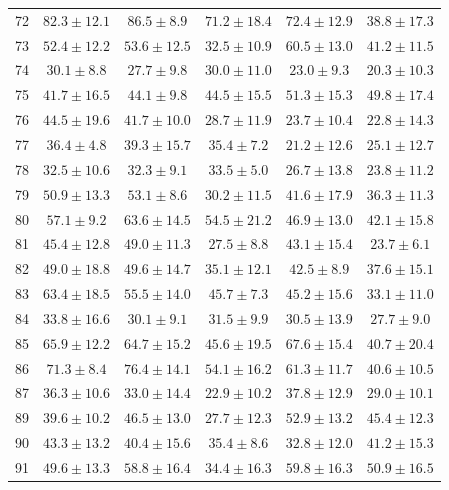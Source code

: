 \begin{tabular}{lccccc}
72 & $82.3 \pm 12.1$ & $\mathbf{86.5} \pm 8.9$ & $71.2 \pm 18.4$ & $72.4 \pm 12.9$ & $38.8 \pm 17.3$ \\
73 & $52.4 \pm 12.2$ & $53.6 \pm 12.5$ & $32.5 \pm 10.9$ & $\mathbf{60.5} \pm 13.0$ & $41.2 \pm 11.5$ \\
74 & $\mathbf{30.1} \pm 8.8$ & $27.7 \pm 9.8$ & $30.0 \pm 11.0$ & $23.0 \pm 9.3$ & $20.3 \pm 10.3$ \\
75 & $41.7 \pm 16.5$ & $44.1 \pm 9.8$ & $44.5 \pm 15.5$ & $\mathbf{51.3} \pm 15.3$ & $49.8 \pm 17.4$ \\
76 & $\mathbf{44.5} \pm 19.6$ & $41.7 \pm 10.0$ & $28.7 \pm 11.9$ & $23.7 \pm 10.4$ & $22.8 \pm 14.3$ \\
77 & $36.4 \pm 4.8$ & $\mathbf{39.3} \pm 15.7$ & $35.4 \pm 7.2$ & $21.2 \pm 12.6$ & $25.1 \pm 12.7$ \\
78 & $32.5 \pm 10.6$ & $32.3 \pm 9.1$ & $\mathbf{33.5} \pm 5.0$ & $26.7 \pm 13.8$ & $23.8 \pm 11.2$ \\
79 & $50.9 \pm 13.3$ & $\mathbf{53.1} \pm 8.6$ & $30.2 \pm 11.5$ & $41.6 \pm 17.9$ & $36.3 \pm 11.3$ \\
80 & $57.1 \pm 9.2$ & $\mathbf{63.6} \pm 14.5$ & $54.5 \pm 21.2$ & $46.9 \pm 13.0$ & $42.1 \pm 15.8$ \\
81 & $45.4 \pm 12.8$ & $\mathbf{49.0} \pm 11.3$ & $27.5 \pm 8.8$ & $43.1 \pm 15.4$ & $23.7 \pm 6.1$ \\
82 & $49.0 \pm 18.8$ & $\mathbf{49.6} \pm 14.7$ & $35.1 \pm 12.1$ & $42.5 \pm 8.9$ & $37.6 \pm 15.1$ \\
83 & $\mathbf{63.4} \pm 18.5$ & $55.5 \pm 14.0$ & $45.7 \pm 7.3$ & $45.2 \pm 15.6$ & $33.1 \pm 11.0$ \\
84 & $\mathbf{33.8} \pm 16.6$ & $30.1 \pm 9.1$ & $31.5 \pm 9.9$ & $30.5 \pm 13.9$ & $27.7 \pm 9.0$ \\
85 & $65.9 \pm 12.2$ & $64.7 \pm 15.2$ & $45.6 \pm 19.5$ & $\mathbf{67.6} \pm 15.4$ & $40.7 \pm 20.4$ \\
86 & $71.3 \pm 8.4$ & $\mathbf{76.4} \pm 14.1$ & $54.1 \pm 16.2$ & $61.3 \pm 11.7$ & $40.6 \pm 10.5$ \\
87 & $36.3 \pm 10.6$ & $33.0 \pm 14.4$ & $22.9 \pm 10.2$ & $\mathbf{37.8} \pm 12.9$ & $29.0 \pm 10.1$ \\
89 & $39.6 \pm 10.2$ & $46.5 \pm 13.0$ & $27.7 \pm 12.3$ & $\mathbf{52.9} \pm 13.2$ & $45.4 \pm 12.3$ \\
90 & $\mathbf{43.3} \pm 13.2$ & $40.4 \pm 15.6$ & $35.4 \pm 8.6$ & $32.8 \pm 12.0$ & $41.2 \pm 15.3$ \\
91 & $49.6 \pm 13.3$ & $58.8 \pm 16.4$ & $34.4 \pm 16.3$ & $\mathbf{59.8} \pm 16.3$ & $50.9 \pm 16.5$ \\

\end{tabular}
